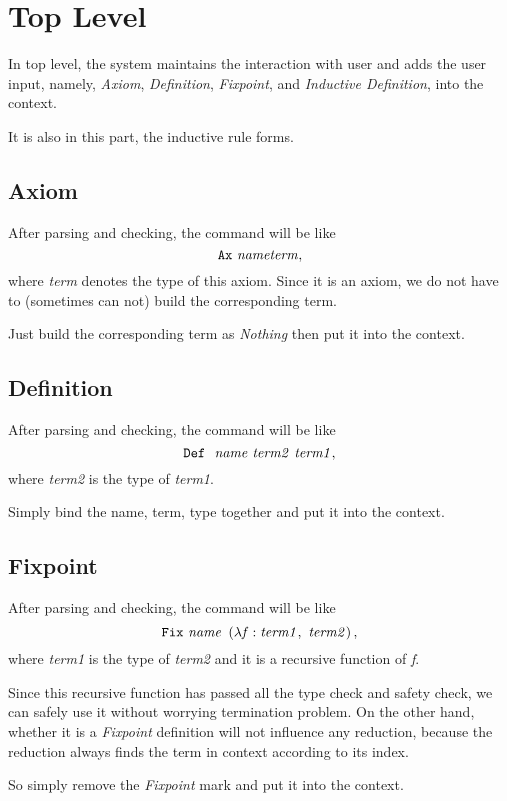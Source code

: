\section{Top Level}

In top level, the system maintains the interaction with user and
adds the user input, namely, \textit{Axiom}, \textit{Definition}, \textit{Fixpoint}, and \textit{Inductive Definition}, 
into the context.\par
It is also in this part, the inductive rule forms.

\subsection{Axiom}
After parsing and checking, the command will be like
$$
\tt Ax\ {\it name term},
$$ 
where {\it term} denotes the type of this axiom.
Since it is an axiom, we do not have to (sometimes can not) build the corresponding term.\par
Just build the corresponding term as {\it Nothing} then put it into the context.

\subsection{Definition}
After parsing and checking, the command will be like
$$
\tt Def\ \ {\it name\ term2\ term1},
$$
where {\it term2} is the type of {\it term1}.\par
Simply bind the name, term, type together and put it into the context.

\subsection{Fixpoint}
After parsing and checking, the command will be like
$$
\tt Fix\ {\it name }\ \left(\lambda {\it f}:{ \it term1},\ {\it term2}\right),
$$
where {\it term1} is the type of {\it term2} and it is a recursive function of {\it f}.\par 
Since this recursive function has passed all the type check and safety check, we can safely use it without worrying termination
problem.
On the other hand, whether it is a {\it Fixpoint} definition will not influence any reduction, because the reduction
always finds the term in context according to its index.\par
So simply remove the {\it Fixpoint} mark and put it into the context.

